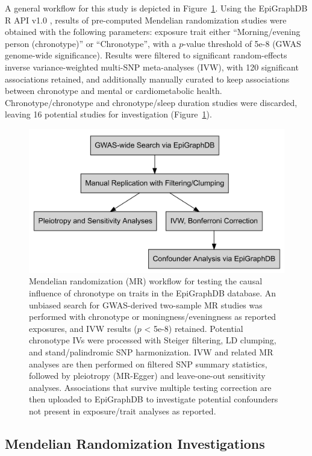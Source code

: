 \documentclass[genes,article,accept,moreauthors,pdftex]{Definitions/mdpi}
\begin{document}
A general workflow for this study is depicted in Figure~\ref{fig:MR_Workflow}. Using the EpiGraphDB R API v1.0 \cite{liu_epigraphdb_2020}, results of pre-computed Mendelian randomization studies were obtained with the following parameters: exposure trait either ``Morning/evening person (chronotype)'' or ``Chronotype'', with a $p$-value threshold of 5e-8 (GWAS genome-wide significance). Results were filtered to significant {random}-effects inverse variance-weighted multi-SNP meta-analyses (IVW), with 120 significant associations retained, and additionally manually curated to keep associations between chronotype and mental or cardiometabolic health. Chronotype/chronotype and chronotype/sleep duration studies were discarded, leaving 16 potential studies for investigation (Figure~\ref{fig:MR_Workflow}).
\begin{figure}[H]
	\includegraphics[width=0.9\linewidth]{Figs/Analysis1/outline.png}
	\caption{Mendelian randomization (MR) workflow for testing the causal influence of chronotype on traits in the EpiGraphDB database. An unbiased search for GWAS-derived two-sample MR studies was performed with chronotype or moningness/eveningness as reported exposures, and IVW results ($p$ < 5e-8) retained. Potential chronotype IVs were processed with Steiger filtering, LD clumping, and stand/palindromic SNP harmonization. IVW and related MR analyses are then performed on filtered SNP summary statistics, followed by pleiotropy (MR-Egger) and leave-one-out sensitivity analyses. Associations that survive multiple testing correction are then uploaded to EpiGraphDB to investigate potential confounders not present in exposure/trait analyses as reported.}
	\label{fig:MR_Workflow}
\end{figure}

\subsection{Mendelian Randomization Investigations}
\end{document}

